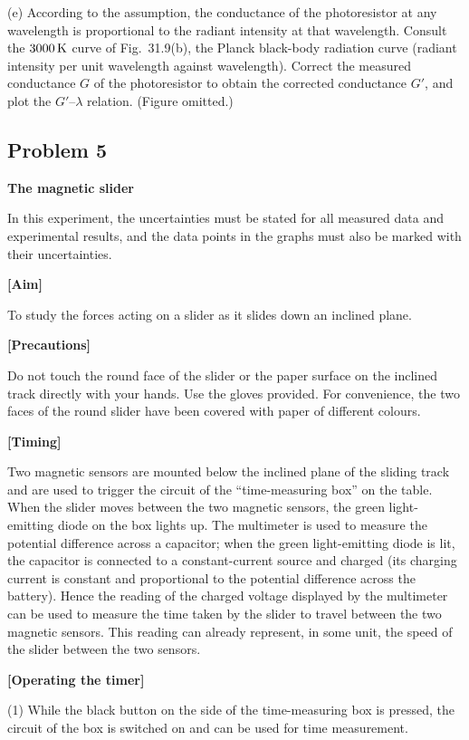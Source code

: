(e) According to the assumption, the conductance of the photoresistor at any wavelength is proportional to the radiant intensity at that wavelength. Consult the $3000\,\mathrm{K}$ curve of Fig.~31.9(b), the Planck black-body radiation curve (radiant intensity per unit wavelength against wavelength). Correct the measured conductance $G$ of the photoresistor to obtain the corrected conductance $G'$, and plot the $G'$--$\lambda$ relation. (Figure omitted.)

\subsection*{Problem 5}

\textbf{The magnetic slider}

In this experiment, the uncertainties must be stated for all measured data and experimental results, and the data points in the graphs must also be marked with their uncertainties.

\textbf{[Aim]}

To study the forces acting on a slider as it slides down an inclined plane.

\textbf{[Precautions]}

Do not touch the round face of the slider or the paper surface on the inclined track directly with your hands. Use the gloves provided. For convenience, the two faces of the round slider have been covered with paper of different colours.

\textbf{[Timing]}

Two magnetic sensors are mounted below the inclined plane of the sliding track and are used to trigger the circuit of the ``time-measuring box'' on the table. When the slider moves between the two magnetic sensors, the green light-emitting diode on the box lights up. The multimeter is used to measure the potential difference across a capacitor; when the green light-emitting diode is lit, the capacitor is connected to a constant-current source and charged (its charging current is constant and proportional to the potential difference across the battery). Hence the reading of the charged voltage displayed by the multimeter can be used to measure the time taken by the slider to travel between the two magnetic sensors. This reading can already represent, in some unit, the speed of the slider between the two sensors.

\textbf{[Operating the timer]}

(1) While the black button on the side of the time-measuring box is pressed, the circuit of the box is switched on and can be used for time measurement.

